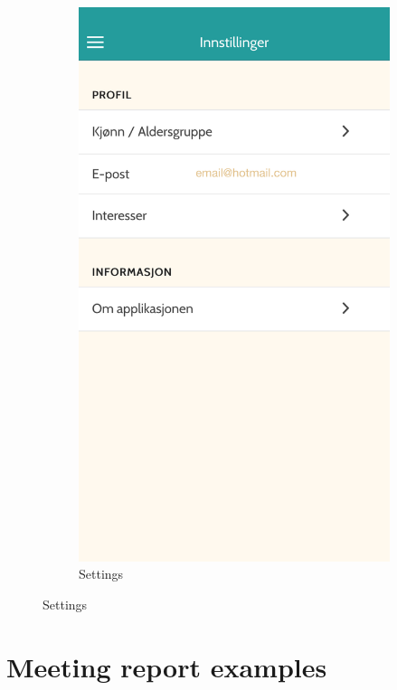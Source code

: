 \begin{appendices}
\begin{figure}[h]
\begin{subfigure}[h]{0.3\textwidth}
			\includegraphics[width=\textwidth]{fig/screenshot_settings}
			\caption{Settings}
		\end{subfigure}
	\end{figure}
	
\chapter{Meeting report examples}
\label{app:meetingreport}

	

	

\end{appendices}
\cleardoublepage